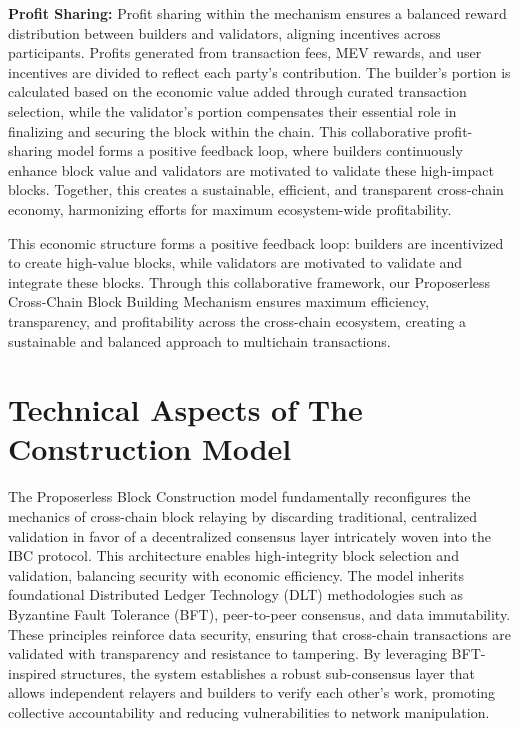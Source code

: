 \documentclass{article}
\begin{document}
\textbf{Profit Sharing:} Profit sharing within the mechanism ensures a balanced reward distribution between builders and validators, aligning incentives across participants. Profits generated from transaction fees, MEV rewards, and user incentives are divided to reflect each party’s contribution. The builder’s portion is calculated based on the economic value added through curated transaction selection, while the validator’s portion compensates their essential role in finalizing and securing the block within the chain. This collaborative profit-sharing model forms a positive feedback loop, where builders continuously enhance block value and validators are motivated to validate these high-impact blocks. Together, this creates a sustainable, efficient, and transparent cross-chain economy, harmonizing efforts for maximum ecosystem-wide profitability.

This economic structure forms a positive feedback loop: builders are incentivized to create high-value blocks, while validators are motivated to validate and integrate these blocks. Through this collaborative framework, our Proposerless Cross-Chain Block Building Mechanism ensures maximum efficiency, transparency, and profitability across the cross-chain ecosystem, creating a sustainable and balanced approach to multichain transactions.

\section*{Technical Aspects of The Construction Model}

The Proposerless Block Construction model fundamentally reconfigures the mechanics of cross-chain block relaying by discarding traditional, centralized validation in favor of a decentralized consensus layer intricately woven into the IBC protocol. This architecture enables high-integrity block selection and validation, balancing security with economic efficiency. The model inherits foundational Distributed Ledger Technology (DLT) methodologies such as Byzantine Fault Tolerance (BFT), peer-to-peer consensus, and data immutability. These principles reinforce data security, ensuring that cross-chain transactions are validated with transparency and resistance to tampering. By leveraging BFT-inspired structures, the system establishes a robust sub-consensus layer that allows independent relayers and builders to verify each other’s work, promoting collective accountability and reducing vulnerabilities to network manipulation.
\end{document}
